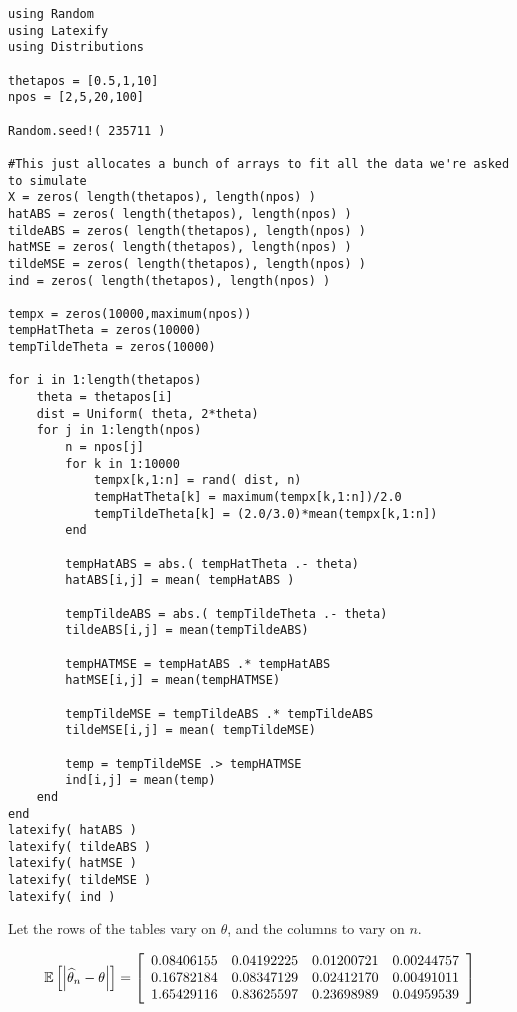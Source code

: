 \documentclass[12pt]{paper}
\begin{document}
\begin{verbatim}
using Random
using Latexify
using Distributions

thetapos = [0.5,1,10]
npos = [2,5,20,100]

Random.seed!( 235711 )

#This just allocates a bunch of arrays to fit all the data we're asked to simulate
X = zeros( length(thetapos), length(npos) )
hatABS = zeros( length(thetapos), length(npos) )
tildeABS = zeros( length(thetapos), length(npos) )
hatMSE = zeros( length(thetapos), length(npos) )
tildeMSE = zeros( length(thetapos), length(npos) )
ind = zeros( length(thetapos), length(npos) )

tempx = zeros(10000,maximum(npos))
tempHatTheta = zeros(10000)
tempTildeTheta = zeros(10000)
    
for i in 1:length(thetapos)
    theta = thetapos[i]
    dist = Uniform( theta, 2*theta)
    for j in 1:length(npos)
        n = npos[j]
        for k in 1:10000
            tempx[k,1:n] = rand( dist, n)
            tempHatTheta[k] = maximum(tempx[k,1:n])/2.0
            tempTildeTheta[k] = (2.0/3.0)*mean(tempx[k,1:n])
        end

        tempHatABS = abs.( tempHatTheta .- theta)
        hatABS[i,j] = mean( tempHatABS )

        tempTildeABS = abs.( tempTildeTheta .- theta)
        tildeABS[i,j] = mean(tempTildeABS)

        tempHATMSE = tempHatABS .* tempHatABS
        hatMSE[i,j] = mean(tempHATMSE)

        tempTildeMSE = tempTildeABS .* tempTildeABS
        tildeMSE[i,j] = mean( tempTildeMSE)

        temp = tempTildeMSE .> tempHATMSE
        ind[i,j] = mean(temp)
    end
end
latexify( hatABS )
latexify( tildeABS )
latexify( hatMSE )
latexify( tildeMSE )
latexify( ind )
\end{verbatim}

Let the rows of the tables vary on $\theta$, and the columns to vary on $n$.

\begin{equation}
  \mathbb{E} \left [  \left \lvert  \widehat{ \theta }_{n} - \theta \right \rvert \right ] = 
\left[
\begin{array}{cccc}
0.08406155 & 0.04192225 & 0.01200721 & 0.00244757 \\ 
0.16782184 & 0.08347129 & 0.02412170 & 0.00491011 \\ 
1.65429116 & 0.83625597 & 0.23698989 & 0.04959539 \\ 
\end{array}
\right]
\end{equation}
\end{document}
